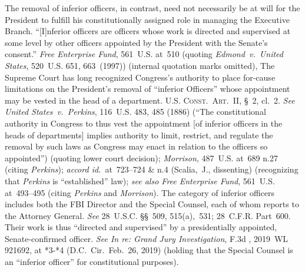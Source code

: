 The removal of inferior officers, in contrast, need not necessarily be at will for the President to fulfill his constitutionally assigned role in managing the Executive Branch.
``[I]nferior officers are officers whose work is directed and supervised at some level by other officers appointed by the President with the Senate's consent.''
\textit{Free Enterprise Fund}, 561~U.S. at~510 (quoting \textit{Edmond~v.\ United States}, 520~U.S. 651, 663~(1997)) (internal quotation marks omitted), The Supreme Court has long recognized Congress's authority to place for-cause limitations on the President's removal of ``inferior Officers'' whose appointment may be vested in the head of a department.
\textsc{U.S. Const.\ Art.~II}, \S~2, cl.~2.
\textit{See United States~v.\ Perkins}, 116~U.S. 483, 485 (1886) (``The constitutional authority in Congress to thus vest the appointment [of inferior officers in the heads of departments] implies authority to limit, restrict, and regulate the removal by such laws as Congress may enact in relation to the officers so appointed'') (quoting lower court decision);
\textit{Morrison}, 487~U.S. at~689 n.27 (citing \textit{Perkins});
\textit{accord id.}~at~723--724 \& n.4 (Scalia,~J., dissenting) (recognizing that \textit{Perkins} is ``established'' law);
\textit{see also Free Enterprise Fund}, 561~U.S. at~493--495 (citing \textit{Perkins} and \textit{Morrison}).
The category of inferior officers includes both the FBI Director and the Special Counsel, each of whom reports to the Attorney General.
\textit{See} 28~U.S.C. \S\S~509, 515(a),~531; 28~C.F.R. Part~600.
Their work is thus ``directed and supervised'' by a presidentially appointed, Senate-confirmed officer.
\textit{See In re: Grand Jury Investigation}, \textunderscore\textunderscore F.3d \textunderscore\textunderscore, 2019~WL 921692, at *3-*4 (D.C.~Cir.\ Feb.~26, 2019) (holding that the Special Counsel is an ``inferior officer'' for constitutional purposes).


